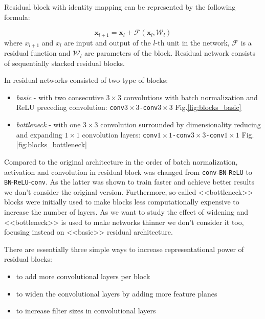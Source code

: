\documentclass{bmvc2k}
\newcommand{\ve}[1]{\mathbf{#1}} %
\begin{document}
Residual block with identity mapping can be represented by the following formula:

\begin{equation}
\ve{x}_{l+1} = \ve{x}_{l} + \mathcal{F}(\ve{x}_{l}, \mathcal{W}_l)
\end{equation}
where $x_{l+1}$ and $x_l$ are input and output of the $l$-th unit in the network, $\mathcal{F}$ is a residual function and $\mathcal{W}_l$ are parameters of the block. Residual network consists of sequentially stacked residual blocks.

In \cite{basicblock2} residual networks consisted of two type of blocks:

\begin{itemize}
  \item{\textit{basic} - with two consecutive $3\times3$ convolutions with batch normalization and ReLU preceding convolution: \texttt{conv$3\times3$-conv$3\times3$} Fig.\ref{fig:blocks_basic}}
  \item{\textit{bottleneck} - with one $3\times3$ convolution surrounded by dimensionality reducing and expanding $1\times1$ convolution layers: \texttt{conv$1\times1$-conv$3\times3$-conv$1\times1$} Fig.\ref{fig:blocks_bottleneck}}
\end{itemize}

Compared to the original architecture \cite{he2015deep} in \cite{basicblock2} the order of batch normalization, activation and convolution in residual block was changed from \texttt{conv}-\texttt{BN}-\texttt{ReLU} to \texttt{BN}-\texttt{ReLU}-\texttt{conv}. As the latter was shown to train faster and achieve better results we don't consider the original version.
Furthermore,
so-called  <<bottleneck>> blocks were initially used to make blocks less computationally expensive to increase the number of layers. As we want to study the effect of widening and <<bottleneck>> is used to make networks thinner we don't consider it too,  focusing instead on  <<basic>> residual architecture.

There are essentially three simple ways to increase representational power of residual blocks:
\vspace{-0.1cm}
\begin{itemize}
    \setlength\itemsep{-0.2em}
  \item{to add more convolutional layers per block}
  \item{to widen the convolutional layers by adding more feature planes}
  \item{to increase filter sizes in convolutional layers}
\end{itemize}
\end{document}
